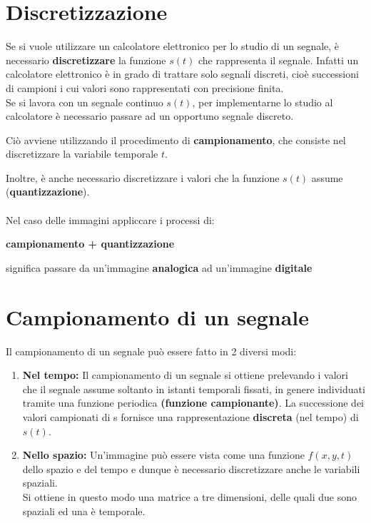 \section{Discretizzazione}
Se si vuole utilizzare un calcolatore elettronico per lo studio di un
segnale, è necessario \textbf{discretizzare} la funzione $s(t)$ che rappresenta
il segnale. Infatti un calcolatore elettronico è in grado di trattare
solo segnali discreti, cioè successioni di campioni i cui valori sono
rappresentati con precisione finita.
\\Se si lavora con un segnale continuo $s(t)$, per implementarne lo
studio al calcolatore è necessario passare ad un opportuno segnale
discreto.
\begin{center}
    Ciò avviene utilizzando il procedimento di \textbf{campionamento}, che consiste nel discretizzare la variabile temporale $t$.
\end{center}
Inoltre, è anche necessario discretizzare i valori che la funzione $s(t)$
assume (\textbf{quantizzazione}).
\\\\Nel caso delle immagini appliccare i processi di:
\begin{center}
    \textbf{campionamento + quantizzazione}
\end{center}
significa passare da un'immagine \textbf{analogica} ad un'immagine \textbf{digitale}
\section{Campionamento di un segnale}
Il campionamento di un segnale può essere fatto in 2 diversi modi:
\begin{enumerate}
    \item \textbf{Nel tempo:} Il campionamento di un segnale si ottiene prelevando
          i valori che il segnale assume soltanto in istanti temporali fissati, in genere individuati tramite una funzione periodica \textbf{(funzione campionante)}.
          La successione dei valori campionati di s fornisce una rappresentazione \textbf{discreta} (nel tempo) di $s(t)$.
    \item \textbf{Nello spazio:} Un’immagine può essere vista come una funzione $f(x,y,t)$ dello spazio e del tempo e dunque è necessario discretizzare anche le variabili spaziali.
          \\Si ottiene in questo modo una matrice a tre dimensioni, delle quali due sono spaziali ed una è temporale.
\end{enumerate}
